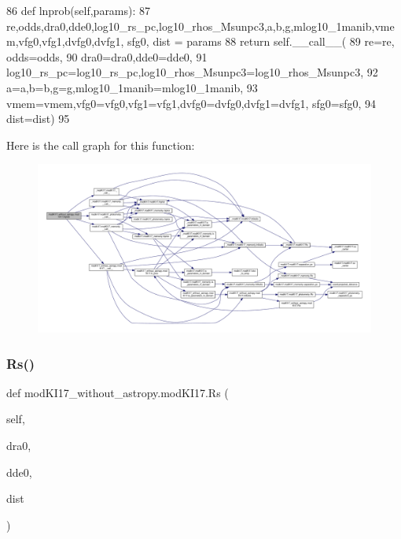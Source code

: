 \begin{DoxyCode}
86     \textcolor{keyword}{def }lnprob(self,params):
87         re,odds,dra0,dde0,log10\_rs\_pc,log10\_rhos\_Msunpc3,a,b,g,mlog10\_1manib,vmem,vfg0,vfg1,dvfg0,dvfg1, 
      sfg0, dist = params
88         \textcolor{keywordflow}{return} self.\_\_call\_\_(
89             re=re, odds=odds,
90             dra0=dra0,dde0=dde0,
91             log10\_rs\_pc=log10\_rs\_pc,log10\_rhos\_Msunpc3=log10\_rhos\_Msunpc3,
92             a=a,b=b,g=g,mlog10\_1manib=mlog10\_1manib,
93             vmem=vmem,vfg0=vfg0,vfg1=vfg1,dvfg0=dvfg0,dvfg1=dvfg1, sfg0=sfg0, 
94             dist=dist)
95     
\end{DoxyCode}
Here is the call graph for this function\+:\nopagebreak
\begin{figure}[H]
\begin{center}
\leavevmode
\includegraphics[width=350pt]{d3/df4/classmodKI17__without__astropy_1_1modKI17_abd696e0c2e8175f37ed01a6d60799458_cgraph}
\end{center}
\end{figure}
\mbox{\label{classmodKI17__without__astropy_1_1modKI17_a244312ee38d1fb267b6df28b53096c14}} 
\subsubsection{\texorpdfstring{Rs()}{Rs()}}
{\footnotesize\ttfamily def mod\+K\+I17\+\_\+without\+\_\+astropy.\+mod\+K\+I17.\+Rs (\begin{DoxyParamCaption}\item[{}]{self,  }\item[{}]{dra0,  }\item[{}]{dde0,  }\item[{}]{dist }\end{DoxyParamCaption})}



